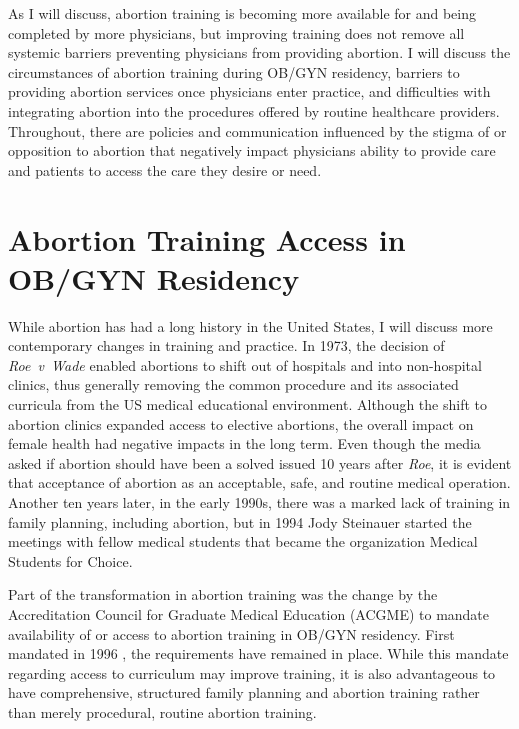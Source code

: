 \documentclass[letterpaper, 12pt]{article}
\begin{document}
As I will discuss, abortion training is becoming more available for and being completed by more physicians, but improving training does not remove all systemic barriers preventing physicians from providing abortion. I will discuss the circumstances of abortion training during OB/GYN residency, barriers to providing abortion services once physicians enter practice, and difficulties with integrating abortion into the procedures offered by routine healthcare providers. Throughout, there are policies and communication influenced by the stigma of or opposition to abortion that negatively impact physicians ability to provide care and patients to access the care they desire or need.

\section*{Abortion Training Access in OB/GYN Residency}

While abortion has had a long history \autocite[For a thesis about training for both procedural and elective abortions in the United States from 1920 to 2007, see:][]{ayres_providing_2009} in the United States, I will discuss more contemporary changes in training and practice.
In 1973, the decision of \textit{Roe~v~Wade} enabled abortions to shift out of hospitals and into non-hospital clinics, thus generally removing the common procedure and its associated curricula from the US medical educational environment. \autocite[pg. 404]{aksel_unintended_2013}
Although the shift to abortion clinics expanded access to elective abortions, the overall impact on female health had negative impacts in the long term.
Even though the media asked if abortion should have been a solved issued 10 years after \textit{Roe}\autocite{mark_obenhaus_abortion_1983}, it is evident that acceptance of abortion as an acceptable, safe, and routine medical operation.
Another ten years later, in the early 1990s, there was a marked lack of training in family planning, including abortion, but in 1994 Jody Steinauer started the meetings with fellow medical students that became the organization Medical Students for Choice. \autocite[pg. 404--5]{aksel_unintended_2013}

Part of the transformation in abortion training was the change by the Accreditation Council for Graduate Medical Education (ACGME) to mandate availability of or access to abortion training in OB/GYN residency. \autocite[IV.A.6.d, pg. 17]{accreditation_council_for_graduate_medical_education_acgme_2014}
First mandated in 1996 \autocite[pg. 146]{freedman_obstacles_2010}, the requirements have remained in place.
While this mandate regarding access to curriculum may improve training, it is also advantageous to have comprehensive, structured family planning and abortion training rather than merely procedural, routine abortion training. \autocite[pg. 297]{macisaac_routine_2012}
\end{document}
